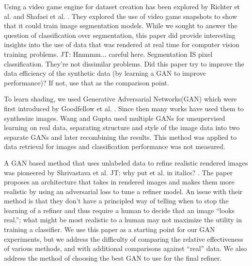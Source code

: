 \documentclass[10pt,twocolumn,letterpaper]{article}
\newcommand{\tompson}[1]{{\color{green} JT: #1}}
\begin{document}
Using a video game engine for dataset creation has been explored by Richter et al. \cite{DBLP:journals/corr/RichterVRK16} and  Shafaei et al. \cite{DBLP:journals/corr/ShafaeiLS16}. They explored the use of video game snapshots to show that it could train image segmentation models. While we sought to answer the question of classification over segmentation, this paper did provide interesting insights into the use of data that was rendered at real time for computer vision training problems. \tompson{Hmmmm... careful here. Segmentation IS pixel classification. They're not dissimilar problems. Did this paper try to improve the data efficiency of the synthetic data (by learning a GAN to improve performance)? If not, use that as the comparison point.}


To learn shading, we used Generative Adversarial Networks(GAN) which were first introduced by Goodfellow et al. \cite{goodfellow}. Since then many works have used them to synthesize images. Wang and Gupta \cite{DBLP:journals/corr/WangG16} used multiple GANs for unsupervised learning on real data, separating structure and style of the image data into two separate GANs and later recombining the results. This method was applied to data retrieval for images and classification performance was not measured.

A GAN based method that uses unlabeled data to refine realistic rendered images was pioneered by
Shrivastava et al. \tompson{why put et al. in italics?} \cite{DBLP:journals/corr/ShrivastavaPTSW16}. The paper proposes an architecture that takes in rendered images and makes them more realistic by using an adversarial loss to tune a refiner model. An issue with their method is that they don't have a principled way of telling when to stop the learning of a refiner and thus require a human to decide that an image ``looks real.''; what might be most realistic to a human may not maximize the utility in training a classifier. We use this paper as a starting point for our GAN experiments,  but we address the difficulty of comparing the relative effectiveness of various methods, and with additional comparisons against ``real'' data.  We also address the method of choosing the best GAN to use for the final refiner.  
\end{document}
